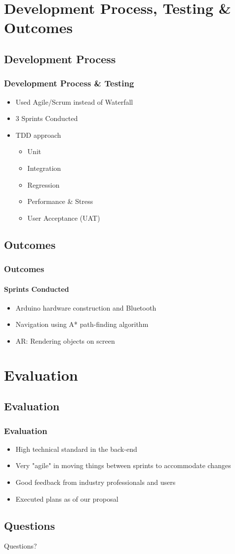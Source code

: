 \documentclass[compress]{beamer}
\begin{document}
	\section{Development Process, Testing \& Outcomes}
	\subsection{Development Process}
	\begin{frame}
	    \frametitle{Development Process \& Testing}
		\begin{itemize}
			\item Used Agile/Scrum instead of Waterfall
			\item 3 Sprints Conducted
			\item TDD approach
			\begin{itemize}
				\item Unit
				\item Integration
				\item Regression
				\item Performance \& Stress
				\item User Acceptance (UAT)
			\end{itemize}
		\end{itemize}
	\end{frame}

	\subsection{Outcomes}
	\begin{frame}
		\frametitle{Outcomes}

		\framesubtitle{Sprints Conducted}
		\begin{itemize}
			\item Arduino hardware construction and Bluetooth
			\item Navigation using A* path-finding algorithm
			\item AR: Rendering objects on screen
		\end{itemize}
	\end{frame}

	\section{Evaluation}
	\subsection{Evaluation}
		\begin{frame}
			\frametitle{Evaluation}
			\begin{itemize}
				\item High technical standard in the back-end
				\item Very "agile" in moving things between sprints to accommodate changes
				\item Good feedback from industry professionals and users
				\item Executed plans as of our proposal
			\end{itemize}
		\end{frame}

	\subsection{Questions}
	\begin{frame}
		\begin{center}
			\Huge Questions?
		\end{center}
	\end{frame}
\end{document}
